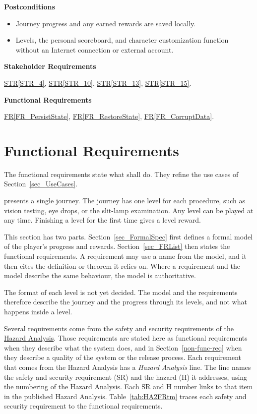 \documentclass[10pt]{article}
\newcommand{\strref}[1]{\hyperref[#1]{STR\ref*{#1}}}
\newcommand{\rref}[1]{\hyperref[#1]{FR\ref*{#1}}}
\newcommand{\haurl}{https://team-hindsight.github.io/ophthamology-game/HazardAnalysis/HazardAnalysis.pdf}
\newcommand{\hadoc}[1]{\href{\haurl}{#1}}
\begin{document}
\textbf{Postconditions}
\begin{itemize}
    \item Journey progress and any earned rewards are saved locally.
    \item Levels, the personal scoreboard, and character customization
    function without an Internet connection or external account.
\end{itemize}

\textbf{Stakeholder Requirements}

\strref{STR_4}, \strref{STR_10}, \strref{STR_13}, \strref{STR_15}.

\textbf{Functional Requirements}

\rref{FR_PersistState}, \rref{FR_RestoreState}, \rref{FR_CorruptData}.

\newpage
\section{Functional Requirements}
\label{sec_FR}

The functional requirements state what \progname{} shall do. They refine the
use cases of Section~\ref{sec_UseCases}.

\progname{} presents a single journey. The journey has one level for each
procedure, such as vision testing, eye drops, or the slit-lamp examination.
Any level can be played at any time. Finishing a level for the first time gives
a level reward.

This section has two parts. Section~\ref{sec_FormalSpec} first defines a
formal model of the player's progress and rewards.
Section~\ref{sec_FRList} then states the functional requirements. A
requirement may use a name from the model, and it then cites the definition or
theorem it relies on. Where a requirement and the model describe the same
behaviour, the model is authoritative.

The format of each level is not yet decided. The model and the requirements
therefore describe the journey and the progress through its levels, and not
what happens inside a level.

Several requirements come from the safety and security requirements of the
\hadoc{Hazard Analysis}. Those requirements are stated here as functional requirements
when they describe what the system does, and in
Section~\ref{non-func-req} when they describe a quality of the system or the
release process. Each requirement that comes from the Hazard Analysis has a
\textit{Hazard Analysis} line. The line names the safety and security
requirement (SR) and the hazard (H) it addresses, using the numbering of the
Hazard Analysis. Each SR and H number links to that item in the published
Hazard Analysis. Table~\ref{tab:HA2FRtm} traces each safety and security
requirement to the functional requirements.
\end{document}
